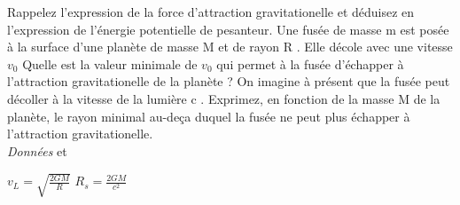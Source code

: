 \begin{Exercise}[title=Rayon de Schwarzschild]
  \Question Rappelez l'expression de la force d'attraction gravitationelle et
  déduisez en l'expression de l'énergie potentielle de pesanteur.
  \Question Une fusée de masse m est posée à la surface d'une planète de masse M
  et de rayon R . Elle décole avec une vitesse $v_0$
Quelle est la valeur minimale de $v_0$ qui permet à la fusée d'échapper à
l'attraction gravitationelle de la planète ?
  \Question On imagine à présent que la fusée peut décoller à la vitesse de la lumière c .
Exprimez, en fonction de la masse M de la planète, le rayon minimal au-deça duquel la fusée ne
peut plus échapper à l'attraction gravitationelle.\\
\emph{Données}  et
\end{Exercise}
\begin{Answer}
  \Question $v_L = \sqrt{\frac{2GM}{R}}$
  \Question $R_s = \frac{2GM}{c^2}$
\end{Answer}
